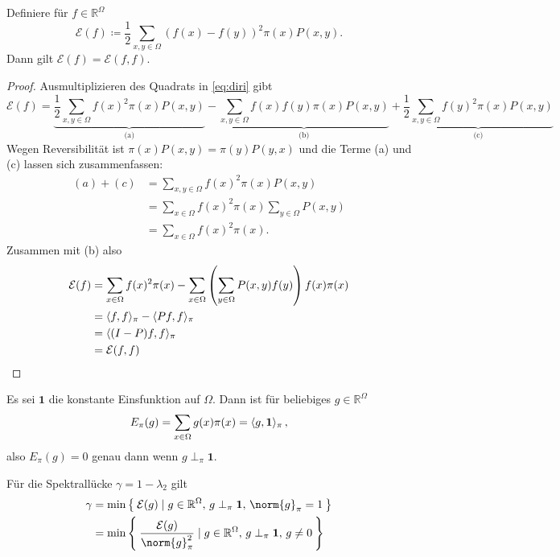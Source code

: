 \documentclass[ngerman,a4paper,11pt]{scrartcl}
\newcommand{\diri}{\mathcal{E}}
\newcommand{\RR}{\mathbb{R}}
\DeclarePairedDelimiter{\sprod}{\langle}{\rangle}	%
\begin{document}
\begin{lem}
 \label{lem:diri}
 Definiere für $f\in\RR^\Omega$
 \begin{equation}
  \label{eq:diri}
  \diri(f)\coloneqq\frac{1}{2}\sum_{x,y\in\Omega}(f(x)-f(y))^2\pi(x)P(x,y).
 \end{equation}
 Dann gilt $\diri(f)=\diri(f,f)$.
\end{lem}
\begin{proof}
  Ausmultiplizieren des Quadrats in \cref{eq:diri} gibt
  \begin{equation*}
   \diri(f)=\underbrace{\frac{1}{2}\sum_{x,y\in\Omega}f(x)^2\pi(x)P(x,y)}_{\text{(a)}}-
   \underbrace{\sum_{x,y\in\Omega}f(x)f(y)\pi(x)P(x,y)}_{\text{(b)}}
   +\underbrace{\frac{1}{2}\sum_{x,y\in\Omega}f(y)^2\pi(x)P(x,y)}_{\text{(c)}}
  \end{equation*}
  Wegen Reversibilität ist $\pi(x)P(x,y)=\pi(y)P(y,x)$ und die Terme (a) und (c)
  lassen sich zusammenfassen:
  \begin{align*}
   (a)+(c)&=\sum_{x,y\in\Omega}f(x)^2\pi(x)P(x,y) \\
   &=\sum_{x\in\Omega}f(x)^2\pi(x)\sum_{y\in\Omega}P(x,y) \\
   &=\sum_{x\in\Omega}f(x)^2\pi(x).
  \end{align*}
  Zusammen mit (b) also
  \begin{align*}
   \diri(f)&=\sum_{x\in\Omega}f(x)^2\pi(x)-\sum_{x\in\Omega}\left(\sum_{y\in\Omega}P(x,y)f(y) \right)f(x)\pi(x) \\
   &=\sprod{f,f}_\pi-\sprod{Pf,f}_\pi \\
   &=\sprod{(I-P)f,f}_\pi \\
   &=\diri(f,f)
  \end{align*}
\end{proof}

\begin{rem}
 Es sei $\mathbf{1}$ die
 konstante Einsfunktion auf $\Omega$. Dann
 ist für beliebiges $g\in\RR^\Omega$
 \begin{equation*}
  E_\pi(g)=\sum_{x\in\Omega}g(x)\pi(x)=\sprod{g,\mathbf{1}}_\pi\, ,
 \end{equation*}
 also $E_\pi(g)=0$ genau dann wenn $g\perp_\pi\mathbf{1}$.
\end{rem}

\begin{lem}
 \label{lem:spekdiri}
 Für die Spektrallücke $\gamma=1-\lambda_2$  gilt
 \begin{align}
  \gamma&=\min\Set{\diri(g)\mid g\in\RR^{\Omega} , \, g\perp_\pi\mathbf{1} , \, \norm{g}_\pi=1} \label{eq:min} \\
        &=\min\Set{\frac{\diri(g)}{\norm{g}_\pi^2}\mid g\in\RR^\Omega,\, g\perp_\pi\mathbf{1},\, g\neq 0} \label{eq:min2}
 \end{align}
\end{lem}
\end{document}
